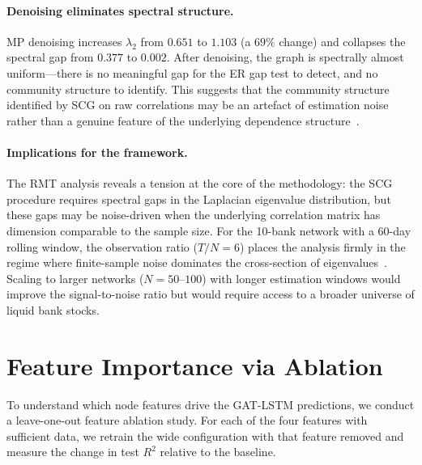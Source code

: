 \paragraph{Denoising eliminates spectral structure.}
MP denoising increases $\lambda_2$ from $0.651$ to $1.103$ (a $69\%$ change) and collapses the spectral gap from $0.377$ to $0.002$. After denoising, the graph is spectrally almost uniform---there is no meaningful gap for the ER gap test to detect, and no community structure to identify. This suggests that the community structure identified by SCG on raw correlations may be an artefact of estimation noise rather than a genuine feature of the underlying dependence structure~\cite{laloux1999noise}.

\paragraph{Implications for the framework.}
The RMT analysis reveals a tension at the core of the methodology: the SCG procedure requires spectral gaps in the Laplacian eigenvalue distribution, but these gaps may be noise-driven when the underlying correlation matrix has dimension comparable to the sample size. For the 10-bank network with a 60-day rolling window, the observation ratio ($T/N = 6$) places the analysis firmly in the regime where finite-sample noise dominates the cross-section of eigenvalues~\cite{laloux1999noise}. Scaling to larger networks ($N = 50$--$100$) with longer estimation windows would improve the signal-to-noise ratio but would require access to a broader universe of liquid bank stocks.


\section{Feature Importance via Ablation}
\label{sec:feature-ablation}

To understand which node features drive the GAT-LSTM predictions, we conduct a leave-one-out feature ablation study. For each of the four features with sufficient data, we retrain the wide configuration with that feature removed and measure the change in test $R^2$ relative to the baseline.

